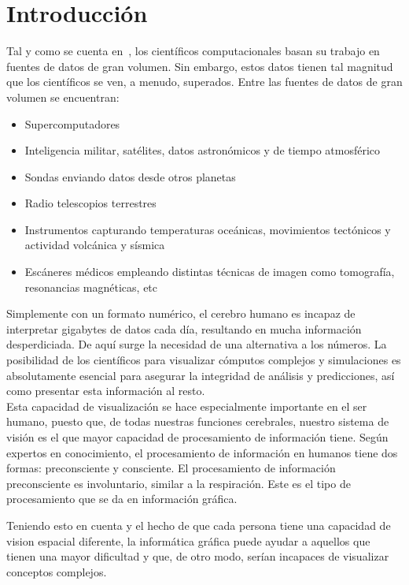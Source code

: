 \cleardoublepage

\chapter{Introducción}
\label{makereference}

Tal y como se cuenta en~\citet{DEFANTI1991247}, los científicos computacionales
basan su trabajo en fuentes de datos de gran volumen. Sin embargo, estos datos
tienen tal magnitud que los científicos se ven, a menudo, superados. Entre las
fuentes de datos de gran volumen se encuentran:

\begin{itemize}
		\item Supercomputadores
		\item Inteligencia militar, satélites, datos astronómicos y de tiempo atmosférico
		\item Sondas enviando datos desde otros planetas
		\item Radio telescopios terrestres
		\item Instrumentos capturando temperaturas oceánicas, movimientos tectónicos y 
				actividad volcánica y sísmica
		\item Escáneres médicos empleando distintas técnicas de imagen como tomografía, 
				resonancias magnéticas, etc
\end{itemize}

Simplemente con un formato numérico, el cerebro humano es incapaz de interpretar
gigabytes de datos cada día, resultando en mucha información desperdiciada. De
aquí surge la necesidad de una alternativa a los números. La posibilidad de los
científicos para visualizar cómputos complejos y simulaciones es absolutamente
esencial para asegurar la integridad de análisis y predicciones, así como
presentar esta información al resto.\\

Esta capacidad de visualización se hace especialmente importante en el ser
humano, puesto que, de todas nuestras funciones cerebrales, nuestro sistema de
visión es el que mayor capacidad de procesamiento de información tiene. Según
expertos en conocimiento, el procesamiento de información en humanos tiene dos
formas: preconsciente y consciente. El procesamiento de información
preconsciente es involuntario, similar a la respiración. Este es el tipo de
procesamiento que se da en información gráfica.
~\citet{Rohrer:2000:SBI:510378.510552}

Teniendo esto en cuenta y el hecho de que cada persona tiene una capacidad de
vision espacial diferente, la informática gráfica puede ayudar a aquellos que
tienen una mayor dificultad y que, de otro modo, serían incapaces de visualizar
conceptos complejos.

